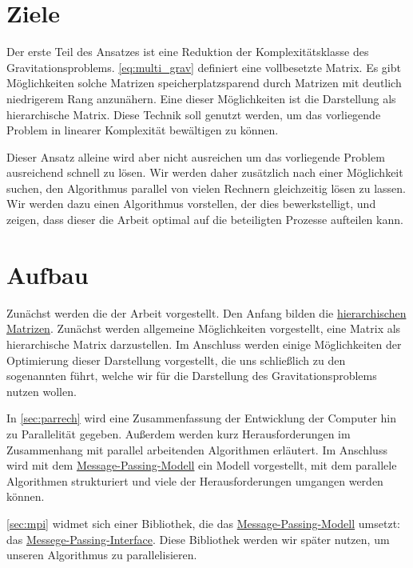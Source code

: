   \section{Ziele}
    Der erste Teil des Ansatzes ist eine Reduktion der Komplexitätsklasse des Gravitationsproblems. \autoref{eq:multi_grav} definiert eine vollbesetzte Matrix. Es gibt Möglichkeiten solche
    Matrizen speicherplatzsparend durch Matrizen mit deutlich niedrigerem Rang anzunähern. Eine dieser Möglichkeiten ist die Darstellung als hierarchische Matrix. Diese Technik soll genutzt
    werden, um das vorliegende Problem in linearer Komplexität bewältigen zu können.
    
    Dieser Ansatz alleine wird aber nicht ausreichen um das vorliegende Problem ausreichend schnell zu lösen. Wir werden daher zusätzlich nach einer Möglichkeit suchen, den Algorithmus parallel
    von vielen Rechnern gleichzeitig lösen zu lassen. Wir werden dazu einen Algorithmus vorstellen, der dies bewerkstelligt, und zeigen, dass dieser die Arbeit optimal auf die beteiligten
    Prozesse aufteilen kann.
  
  \section{Aufbau}
    Zunächst werden die  der Arbeit vorgestellt. Den Anfang bilden die \hyperref[sec:h2]{hierarchischen Matrizen}. Zunächst werden allgemeine Möglichkeiten vorgestellt, 
    eine Matrix als hierarchische Matrix darzustellen. Im Anschluss werden einige Möglichkeiten der Optimierung dieser Darstellung vorgestellt, die uns schließlich zu den sogenannten 
    führt, welche wir für die Darstellung des Gravitationsproblems nutzen wollen.
    
    In \autoref{sec:parrech} wird eine Zusammenfassung der Entwicklung der Computer hin zu Parallelität gegeben. Außerdem werden kurz Herausforderungen im Zusammenhang mit parallel arbeitenden
    Algorithmen erläutert. Im Anschluss wird mit dem \hyperref[sec:mpm]{Message-Passing-Modell} ein Modell vorgestellt, mit dem parallele Algorithmen strukturiert und viele der 
    Herausforderungen umgangen werden können.
    
    \autoref{sec:mpi} widmet sich einer Bibliothek, die das \hyperref[sec:mpm]{Message-Passing-Modell} umsetzt: das \hyperref[sec:mpi]{Messege-Passing-Interface}. Diese Bibliothek werden wir später
    nutzen, um unseren Algorithmus zu parallelisieren.
    
